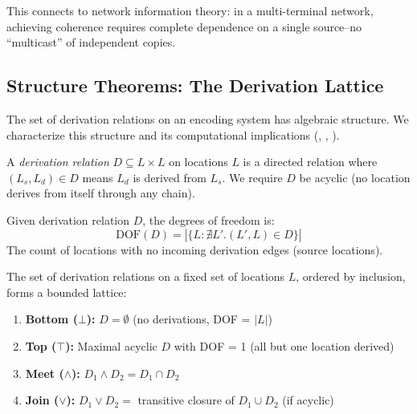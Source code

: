 This connects to network information theory: in a multi-terminal network, achieving coherence requires complete dependence on a single source--no ``multicast'' of independent copies.

\subsection{Structure Theorems: The Derivation Lattice}\label{sec:derivation-structure}

The set of derivation relations on an encoding system has algebraic structure. We characterize this structure and its computational implications (, , ).

\begin{definition}\label{def:derivation-relation}
A \emph{derivation relation} $D \subseteq L \times L$ on locations $L$ is a directed relation where $(L_s, L_d) \in D$ means $L_d$ is derived from $L_s$. We require $D$ be acyclic (no location derives from itself through any chain).
\end{definition}

\begin{definition}\label{def:dof-derivation}
Given derivation relation $D$, the degrees of freedom is:
\[
\text{DOF}(D) = |\{L : \nexists L'. (L', L) \in D\}|
\]
The count of locations with no incoming derivation edges (source locations).
\end{definition}

\begin{theorem}\label{thm:derivation-lattice}
The set of derivation relations on a fixed set of locations $L$, ordered by inclusion, forms a bounded lattice:
\begin{enumerate}
\tightlist
\item \textbf{Bottom ($\bot$):} $D = \emptyset$ (no derivations, DOF = $|L|$)
\item \textbf{Top ($\top$):} Maximal acyclic $D$ with DOF = 1 (all but one location derived)
\item \textbf{Meet ($\land$):} $D_1 \land D_2 = D_1 \cap D_2$
\item \textbf{Join ($\lor$):} $D_1 \lor D_2 = $ transitive closure of $D_1 \cup D_2$ (if acyclic)
\end{enumerate}
\end{theorem}


